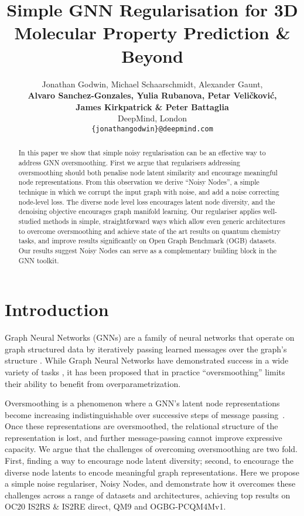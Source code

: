 \documentclass{article} \usepackage{iclr2022_conference,times}
\title{Simple GNN Regularisation for 3D Molecular Property Prediction \& Beyond}
\author{Jonathan Godwin, Michael Schaarschmidt, Alexander Gaunt, \\
\textbf{Alvaro Sanchez-Gonzales, Yulia Rubanova, Petar Veličković,} \\
\textbf{James Kirkpatrick \& Peter Battaglia} \\
DeepMind, London\\
\texttt{\{jonathangodwin\}@deepmind.com} \\
}
\begin{document}
\maketitle

\begin{abstract}
In this paper we show that simple noisy regularisation can be an effective way to address GNN oversmoothing. First we argue that regularisers addressing oversmoothing should both penalise node latent similarity and encourage meaningful node representations. From this observation we derive ``Noisy Nodes'', a simple technique in which we corrupt the input graph with noise, and add a noise correcting node-level loss. The diverse node level loss encourages latent node diversity, and the denoising objective encourages graph manifold learning. Our regulariser applies well-studied methods in simple, straightforward ways which allow even generic architectures to overcome oversmoothing and achieve state of the art results on quantum chemistry tasks, and improve results significantly on Open Graph Benchmark (OGB) datasets. Our results suggest Noisy Nodes can serve as a complementary building block in the GNN toolkit.


\end{abstract}


\section{Introduction}
Graph Neural Networks (GNNs) are a family of neural networks that operate on graph structured data by iteratively passing learned messages over the graph's structure \citep{Scarselli2009GN,bronstein2017geometric,Gilmer2017NeuralMP,Battaglia2018RelationalIB, Shlomi_2021}. While Graph Neural Networks have demonstrated success in a wide variety of tasks \citep{zhou2020graph, wu2020comprehensive, Bapst2020UnveilingTP, Schtt2017SchNetAC, Klicpera2020Dimenet++}, it has been proposed that in practice ``oversmoothing'' limits their ability to benefit from overparametrization.

Oversmoothing is a phenomenon where a GNN's latent node representations become increasing indistinguishable over successive steps of message passing~\citep{Chen2019Oversmoothing}. Once these representations are oversmoothed, the relational structure of the representation is lost, and further message-passing cannot improve expressive capacity. We argue that the challenges of overcoming oversmoothing are two fold. First, finding a way to encourage node latent diversity; second, to encourage the diverse node latents to encode meaningful graph representations. Here we propose a simple noise regulariser, Noisy Nodes, and demonstrate how it overcomes these challenges across a range of datasets and architectures, achieving top results on OC20 IS2RS \& IS2RE direct, QM9 and OGBG-PCQM4Mv1.
\end{document}
